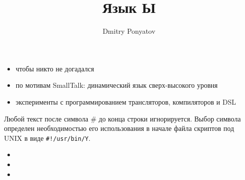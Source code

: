 



\author{Dmitry Ponyatov }
\title{Язык Ы}




\tableofcontents

\secdown\secdown


\begin{itemize}[nosep]
  \item чтобы никто не догадался
  \item по мотивам SmallTalk: динамический язык сверх-высокого уровня
  \item эксперименты с программированием трансляторов, компиляторов и DSL
\end{itemize}

\secdown


Любой текст после символа \# до конца строки игнорируется.
Выбор символа определен необходимостью его использования в начале файла
скриптов под UNIX в виде \verb|#!/usr/bin/Y|.

\secup


\begin{itemize}[nosep]
  \item {}
  \item {}
  \item {}
\end{itemize}


